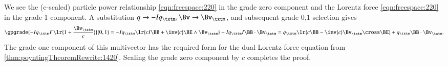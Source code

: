 We see the (c-scaled) particle power relationship
\cref{eqn:freespace:220}
in the grade zero component and the Lorentz force \cref{eqn:freespace:220} in the grade 1 component.
A substitution \( q \rightarrow -I q_\txtm, \Bv \rightarrow \Bv_\txtm \), and subsequent grade 0,1 selection gives
\begin{dmath}\label{eqn:lorentzForce:320}
\gpgrade{
-I q_\txtm F \lr{ 1 + \frac{\Bv_\txtm}{c} }
}{0,1}
=
- I q_\txtm \lr{ c I \BB + \inv{c} \BE \wedge \Bv_\txtm }
- I q_\txtm I \BB \cdot \Bv_\txtm
=
q_\txtm \lr{ c \BB - \inv{c} \Bv_\txtm \cross \BE }
+
q_\txtm \BB \cdot \Bv_\txtm.
\end{dmath}
The grade one component of this multivector has the
required form for the dual Lorentz force equation
from \cref{thm:poyntingTheoremRewrite:1420}.
Scaling the grade zero component by \( c \) completes the proof.



